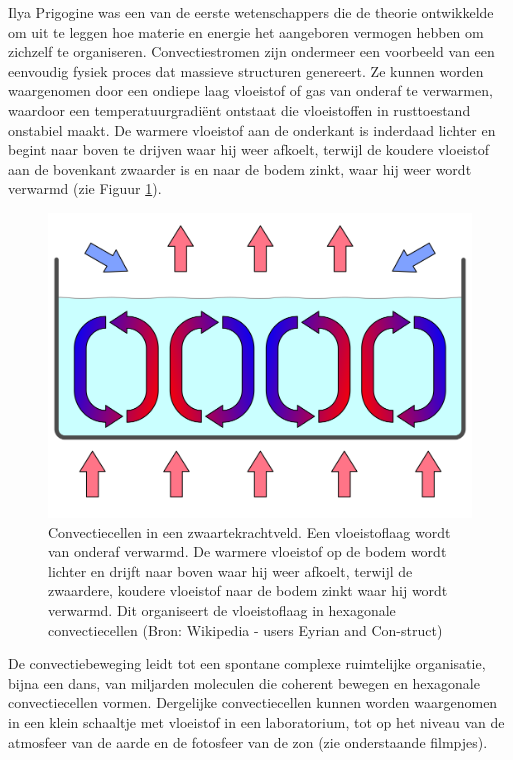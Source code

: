 \documentclass[
  11pt,
]{book}
\begin{document}
Ilya Prigogine was een van de eerste wetenschappers die de theorie ontwikkelde om uit te leggen hoe materie en energie het aangeboren vermogen hebben om zichzelf te organiseren. Convectiestromen zijn ondermeer een voorbeeld van een eenvoudig fysiek proces dat massieve structuren genereert. Ze kunnen worden waargenomen door een ondiepe laag vloeistof of gas van onderaf te verwarmen, waardoor een temperatuurgradiënt ontstaat die vloeistoffen in rusttoestand onstabiel maakt. De warmere vloeistof aan de onderkant is inderdaad lichter en begint naar boven te drijven waar hij weer afkoelt, terwijl de koudere vloeistof aan de bovenkant zwaarder is en naar de bodem zinkt, waar hij weer wordt verwarmd (zie Figuur \ref{fig:convectionCells}).

\begin{figure}

{\centering \includegraphics[width=0.8\linewidth]{./figs/convection_cells} 

}

\caption{Convectiecellen in een zwaartekrachtveld. Een vloeistoflaag wordt van onderaf verwarmd. De warmere vloeistof op de bodem wordt lichter en drijft naar boven waar hij weer afkoelt, terwijl de zwaardere, koudere vloeistof naar de bodem zinkt waar hij wordt verwarmd. Dit organiseert de vloeistoflaag in hexagonale convectiecellen (Bron: Wikipedia - users Eyrian and Con-struct)}\label{fig:convectionCells}
\end{figure}

De convectiebeweging leidt tot een spontane complexe ruimtelijke organisatie, bijna een dans, van miljarden moleculen die coherent bewegen en hexagonale convectiecellen vormen. Dergelijke convectiecellen kunnen worden waargenomen in een klein schaaltje met vloeistof in een laboratorium, tot op het niveau van de atmosfeer van de aarde en de fotosfeer van de zon (zie onderstaande filmpjes).
\end{document}
